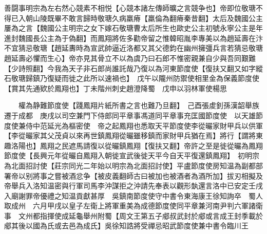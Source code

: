 善闘事明宗為左右然心競素不相悦【心競本諸左傳師曠之言競争也】帝即位敬瑭不得已入朝山陵既畢不敢言歸時敬瑭久病羸瘠【羸倫為翻瘠秦昔翻】太后及魏國公主屢為之言【魏國公主明宗之女下嫁石敬瑭曹太后所生也歐史公主初號永寧公主是年進封魏國長公主為于偽翻】而鳳翔將佐多勸帝留之惟韓昭胤李專美以為趙延壽在汴不宜猜忌敬瑭【趙延夀時為宣武帥逼近洛都又其父德鈞在幽州擁彊兵言若猜忌敬瑭趙延壽必懼而生心】帝亦見其骨立不以為虞乃曰石郎不惟密親兼自少與吾同艱難【少詩照翻】今我為天子非石郎尚誰託哉乃復以為河東節度使【復扶又翻又如字縱石敬瑭歸鎮乃復疑而徙之此所以速禍也】　戊午以隴州防禦使相里金為保義節度使【賞其先通欵於鳳翔也】丁未階州刺史趙澄降蜀　戊申以羽林軍使楊思

　　權為静難節度使【踐鳳翔片紙所書之言也難乃旦翻】　己酉張䖍釗孫漢韶舉族遷于成都　庚戌以司空兼門下侍郎同平章事馮道同平章事充匡國節度使　以天雄節度使兼侍中范延光為樞密使　帝之起鳳翔也悉取天平節度使李從曮家財甲兵以供軍【李從曮家其父茂貞以來再世鎮鳳翔從曮雖移鎮而家財甲兵猶在焉】將行【謂將東趣洛陽也】鳳翔之民遮馬請復以從曮鎮鳳翔【復扶又翻】帝許之至是徙從曮為鳳翔節度使【長興元年從曮自鳳翔入朝徙宣武後徙天平今自天平復還鎮鳳翔】　初明宗為北面招討使【莊宗同光二年始以明宗為北面招討使】平盧節度使房知温為副都部署帝以别將事之嘗被酒忿争【被皮義翻師古曰被加也被酒者為酒所加】拔刃相擬及帝舉兵入洛知温密與行軍司馬李沖謀拒之沖請先奉表以觀形埶還言洛中已安定壬戌入廟謝罪帝優禮之知温貢獻甚厚　吳鎮南節度使守中書令東海康王徐知詢卒　蜀人取成州　六月甲戌以皇子左衛上將軍重美為成德節度使同平章兼河南尹判六軍諸衛事　文州都指揮使成延龜舉州附蜀【周文王第五子郕叔武封於郕或言成王封季載於郕其後以國為氏或去邑為成氏】吳徐知誥將受禪忌昭武節度使兼中書令臨川王

